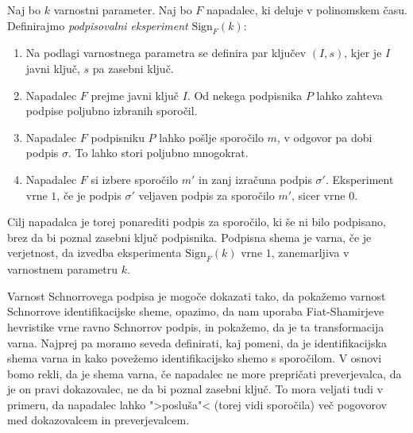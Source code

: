 \begin{definicija}
    Naj bo $k$ varnostni parameter. Naj bo $F$ napadalec, ki deluje v polinomskem času. Definirajmo
    \textit{podpisovalni eksperiment} $\text{Sign}_F(k)$:
    \begin{enumerate}
        \item Na podlagi varnostnega parametra se definira par ključev $(I, s)$, kjer je $I$
            javni ključ, $s$ pa zasebni ključ.
        \item Napadalec $F$ prejme javni ključ $I$. Od nekega podpisnika $P$ lahko zahteva podpise
            poljubno izbranih sporočil.
        \item Napadalec $F$ podpisniku $P$ lahko pošlje sporočilo $m$, v odgovor pa dobi podpis $\sigma$.
            To lahko stori poljubno mnogokrat.
        \item Napadalec $F$ si izbere sporočilo $m'$ in zanj izračuna podpis $\sigma'$. Eksperiment
            vrne $1$, če je podpis $\sigma'$ veljaven podpis za sporočilo $m'$, sicer vrne $0$.
    \end{enumerate}
    Cilj napadalca je torej ponarediti podpis za sporočilo, ki še ni bilo podpisano, brez da bi poznal
    zasebni ključ podpisnika. Podpisna shema je varna, če je verjetnost, da izvedba eksperimenta
    $\text{Sign}_F(k)$ vrne $1$, zanemarljiva v varnostnem parametru $k$.
\end{definicija}

Varnost Schnorrovega podpisa je mogoče dokazati tako, da pokažemo varnost Schnorrove identifikacijske
sheme, opazimo, da nam uporaba Fiat-Shamirjeve hevristike vrne ravno Schnorrov podpis, in pokažemo, da
je ta transformacija varna. Najprej pa moramo seveda definirati, kaj pomeni, da je identifikacijska
shema varna in kako povežemo identifikacijsko shemo s sporočilom. V osnovi bomo rekli, da je shema
varna, če napadalec ne more prepričati preverjevalca, da je on pravi dokazovalec, ne da bi poznal
zasebni ključ. To mora veljati tudi v primeru, da napadalec lahko ">posluša"< (torej vidi sporočila)
več pogovorov med dokazovalcem in preverjevalcem.

